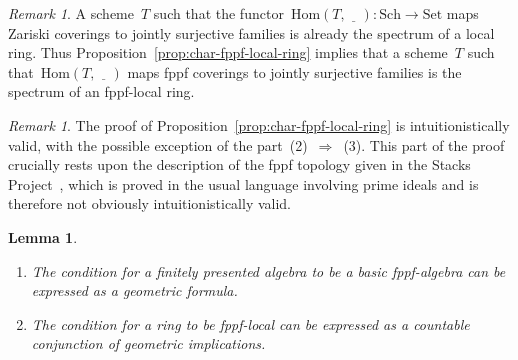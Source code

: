\documentclass[10pt,reqno,a4paper]{amsbook}
\theoremstyle{definition}
\theoremstyle{plain}
\newtheorem{lemma}[defn]{Lemma}
\theoremstyle{remark}
\newtheorem{rem}[defn]{Remark}
\newcommand{\Hom}{\mathrm{Hom}}
\newcommand{\placeholder}{\underline{\quad}}
\newcommand{\Set}{\mathrm{Set}}
\newcommand{\Sch}{\mathrm{Sch}}
\newcommand{\?}{\,{:}\,}
\renewcommand{\_}{\mathpunct{.}\,}
\newcommand{\stacksproject}[1]{\cite[{\href{http://stacks.math.columbia.edu/tag/#1}{Tag~#1}}]{stacks-project}}
\begin{document}
\begin{rem}A scheme~$T$ such that the functor~$\Hom(T, \placeholder) :
\Sch \to \Set$ maps Zariski coverings to jointly surjective
families is already the spectrum of a local ring. Thus
Proposition~\ref{prop:char-fppf-local-ring} implies that a scheme~$T$ such
that~$\Hom(T, \placeholder)$ maps fppf coverings to jointly surjective families
is the spectrum of an fppf-local ring.\end{rem}

\begin{rem}The proof of Proposition~\ref{prop:char-fppf-local-ring} is
intuitionistically valid, with the possible exception of the
part~(2)~$\Rightarrow$~(3). This part of the proof crucially rests upon
the description of the fppf topology given in the Stacks
Project~\stacksproject{05WN}, which is proved in the usual language
involving prime ideals and is therefore not obviously intuitionistically valid.
\end{rem}

\begin{lemma}\label{lemma:basic-fppf-algebra-geometric}
\begin{enumerate}
\item The condition for a finitely presented algebra to be a basic fppf-algebra can
be expressed as a geometric formula.
\item The condition for a ring to be fppf-local can be expressed as a
countable conjunction of geometric implications.
\end{enumerate}
\end{lemma}
\end{document}
